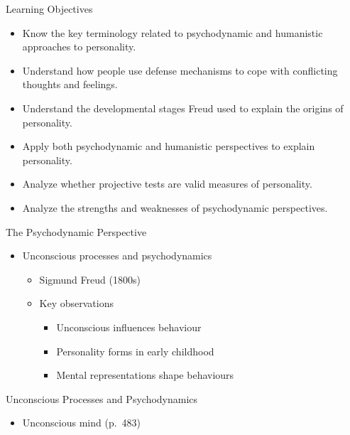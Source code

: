 \documentclass[
]{book}
\providecommand{\tightlist}{%
  \setlength{\itemsep}{0pt}\setlength{\parskip}{0pt}}
\begin{document}
\begin{reflect}
Learning Objectives

\begin{itemize}
\tightlist
\item
  Know the key terminology related to psychodynamic and humanistic approaches to personality.\\
\item
  Understand how people use defense mechanisms to cope with conflicting thoughts and feelings.\\
\item
  Understand the developmental stages Freud used to explain the origins of personality.\\
\item
  Apply both psychodynamic and humanistic perspectives to explain personality.\\
\item
  Analyze whether projective tests are valid measures of personality.\\
\item
  Analyze the strengths and weaknesses of psychodynamic perspectives.
\end{itemize}

The Psychodynamic Perspective

\begin{itemize}
\tightlist
\item
  Unconscious processes and psychodynamics

  \begin{itemize}
  \tightlist
  \item
    Sigmund Freud (1800s)\\
  \item
    Key observations

    \begin{itemize}
    \tightlist
    \item
      Unconscious influences behaviour\\
    \item
      Personality forms in early childhood\\
    \item
      Mental representations shape behaviours
    \end{itemize}
  \end{itemize}
\end{itemize}

Unconscious Processes and Psychodynamics

\begin{itemize}
\tightlist
\item
  Unconscious mind (p.~483)


\end{itemize}
\end{reflect}
\end{document}
